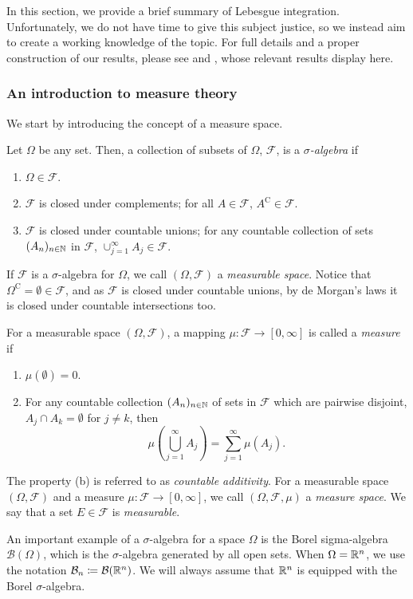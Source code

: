 In this section, we provide a brief summary of Lebesgue integration. Unfortunately, we do not have time to give this subject justice, so we instead aim to create a working knowledge of the topic. For full details and a proper construction of our results, please see {\cite[Chapters 1,2]{stein}} and {\cite[Appendix A]{teschl}}, whose relevant results display here.

\subsubsection{An introduction to measure theory}

We start by introducing the concept of a measure space.

\begin{definition}
  Let $\Omega$ be any set. Then, a collection of subsets of $\Omega$, $\mathcal{F}$, is a {\emph{$\sigma$-algebra}} if
\begin{enumerate}[label=(\alph*)]
  \item $\Omega \in \mathcal{F}$.
  \item $\mathcal{F}$ is closed under complements; for all $A \in \mathcal{F}$, $A^\mathrm{C} \in \mathcal{F}$.
  \item $\mathcal{F}$ is closed under countable unions; for any countable collection of sets $(A_n)_{n \in \mathbb{N}}$ in $\mathcal{F}$, $\cup_{j=1}^{\infty}A_j \in \mathcal{F}$.
\end{enumerate}
If $\mathcal{F}$ is a $\sigma$-algebra for $\Omega$, we call $(\Omega, \mathcal{F})$ a {\emph{measurable space}}. Notice that $\Omega^{\mathrm{C}} = \emptyset \in \mathcal{F}$, and as $\mathcal{F}$ is closed under countable unions, by de Morgan's laws it is closed under countable intersections too.

\medskip

For a measurable space $(\Omega, \mathcal{F})$, a mapping $\mu: \mathcal{F} \to [0, \infty]$ is called a {\emph{measure}} if
\begin{enumerate}[label=(\alph*)]
  \item $\mu(\emptyset) = 0$.
  \item For any countable collection $(A_n)_{n \in \mathbb{N}}$ of sets in $\mathcal{F}$ which are pairwise disjoint, $A_j \cap A_k = \emptyset$ for $j \neq k$, then \[\mu\left(\bigcup_{j=1}^{\infty}A_j\right) = \sum_{j=1}^{\infty}\mu(A_j).\]
\end{enumerate}
The property (b) is referred to as {\emph{countable additivity}}. For a measurable space $(\Omega, \mathcal{F})$ and a measure $\mu: \mathcal{F} \to [0, \infty]$, we call $(\Omega, \mathcal{F}, \mu)$ a {\emph{measure space}}. We say that a set $E \in \mathcal{F}$ is {\emph{measurable}}.
\end{definition}
\begin{example}
  An important example of a $\sigma$-algebra for a space $\Omega$ is the Borel sigma-algebra $\mathcal{B}(\Omega)$, which is the $\sigma$-algebra generated by all open sets. When $\Omega = \mathbb{R}^n$, we use the notation $\mathcal{B}_n \coloneqq \mathcal{B}(\mathbb{R}^n)$. We will always assume that $\mathbb{R}^n$ is equipped with the Borel $\sigma$-algebra.
\end{example}

